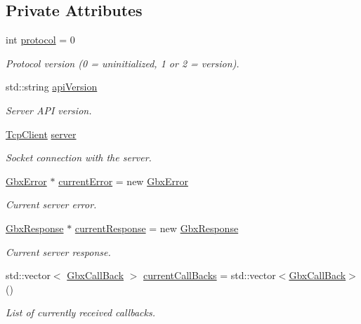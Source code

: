 \subsection*{Private Attributes}
\begin{DoxyCompactItemize}
\item 
int \hyperlink{classGbxRemote_a5ee5c7087085cb6cb2e7bc6135ff0646}{protocol} = 0
\begin{DoxyCompactList}\small\item\em Protocol version (0 = uninitialized, 1 or 2 = version). \end{DoxyCompactList}\item 
std\-::string \hyperlink{classGbxRemote_a81d3c0c70ab7f5e585840e9978ee900e}{api\-Version}
\begin{DoxyCompactList}\small\item\em Server A\-P\-I version. \end{DoxyCompactList}\item 
\hyperlink{classTcpClient}{Tcp\-Client} \hyperlink{classGbxRemote_a0b0b212b945da4266fb645affdac81cb}{server}
\begin{DoxyCompactList}\small\item\em Socket connection with the server. \end{DoxyCompactList}\item 
\hyperlink{structGbxError}{Gbx\-Error} $\ast$ \hyperlink{classGbxRemote_ae5d44c3729140c1eba5e850cb5e5e7bd}{current\-Error} = new \hyperlink{structGbxError}{Gbx\-Error}
\begin{DoxyCompactList}\small\item\em Current server error. \end{DoxyCompactList}\item 
\hyperlink{classGbxResponse}{Gbx\-Response} $\ast$ \hyperlink{classGbxRemote_a3a3a0af1a692a801a33baa292b877dc2}{current\-Response} = new \hyperlink{classGbxResponse}{Gbx\-Response}
\begin{DoxyCompactList}\small\item\em Current server response. \end{DoxyCompactList}\item 
std\-::vector$<$ \hyperlink{classGbxCallBack}{Gbx\-Call\-Back} $>$ \hyperlink{classGbxRemote_a08d047d7e0d4b746fc036c1aa02f0d17}{current\-Call\-Backs} = std\-::vector$<$\hyperlink{classGbxCallBack}{Gbx\-Call\-Back}$>$()
\begin{DoxyCompactList}\small\item\em List of currently received callbacks. \end{DoxyCompactList}\end{DoxyCompactItemize}


